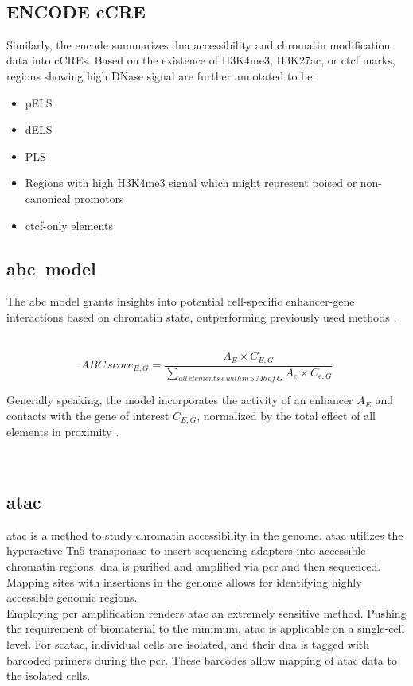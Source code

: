     \subsection{ENCODE \acs{cCRE}}
    Similarly, the \ac{encode} summarizes \ac{dna} accessibility and chromatin modification data into \acfp{cCRE}. Based on the existence of \ac{H3K4me3}, \ac{H3K27ac}, or \ac{ctcf} marks, regions showing high DNase signal are further annotated to be \cite{mooreExpandedEncyclopaediasDNA2020}:
    \begin{itemize}
        \item \ac{pELS}
        \item \ac{dELS}
        \item \ac{PLS}
        \item Regions with high \ac{H3K4me3} signal which might represent poised or non-canonical promotors
        \item \ac{ctcf}-only elements
    \end{itemize}

    \subsection{\acs{abc} model}
    The \acf{abc} model grants insights into potential cell-specific enhancer-gene interactions based on chromatin state, outperforming previously used methods \cite{fulcoActivitybycontactModelEnhancer2019a, nasserGenomewideEnhancerMaps2021a}.

        $$ ABC\,score_{E, G} = \frac{A_E \times C_{E,G}}{\sum\limits_{all\,elements\,e\,within\,5\,Mb\,of\,G} A_e \times C_{e, G}} $$

    Generally speaking, the model incorporates the activity of an enhancer $A_E$ and contacts with the gene of interest $C_{E,G}$, normalized by the total effect of all elements in proximity \cite{fulcoActivitybycontactModelEnhancer2019a, nasserGenomewideEnhancerMaps2021a}.

    \subsection{\acs{atac}}
    \Acf{atac} is a method to study chromatin accessibility in the genome. \Ac{atac} utilizes the hyperactive Tn5 transponase to insert sequencing adapters into accessible chromatin regions. \ac{dna} is purified and amplified via \ac{pcr} and then sequenced. Mapping sites with insertions in the genome allows for identifying highly accessible genomic regions. \cite{buenrostroTranspositionNativeChromatin2013, buenrostroATACseqMethodAssaying2015}\\
    Employing \ac{pcr} amplification renders \ac{atac} an extremely sensitive method. Pushing the requirement of biomaterial to the minimum, \ac{atac} is applicable on a single-cell level. For sc\ac{atac}, individual cells are isolated, and their \ac{dna} is tagged with barcoded primers during the \ac{pcr}. These barcodes allow mapping of \ac{atac} data to the isolated cells. \cite{buenrostroSinglecellChromatinAccessibility2015}

